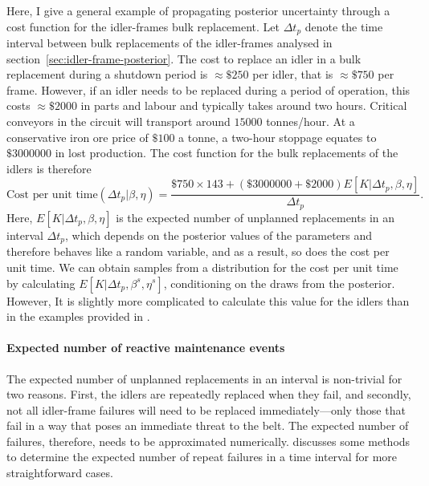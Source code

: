 Here, I give a general example of propagating posterior uncertainty through a cost function for the idler-frames bulk replacement. Let $\Delta t_p$ denote the time interval between bulk replacements of the idler-frames analysed in section~\ref{sec:idler-frame-posterior}. The cost to replace an idler in a bulk replacement during a shutdown period is $\approx\$250$ per idler, that is $\approx\$750$ per frame. However, if an idler needs to be replaced during a period of operation, this costs $\approx\$2000$ in parts and labour and typically takes around two hours. Critical conveyors in the circuit will transport around $15000$ tonnes/hour. At a conservative iron ore price of $\$100$ a tonne, a two-hour stoppage equates to $\$3000000$ in lost production. The cost function for the bulk replacements of the idlers is therefore
\begin{equation*}
 \text{Cost per unit time}(\Delta t_p|\beta, \eta) = \frac{\$750 \times 143 + (\$3000000 + \$2000) E[K|\Delta t_p,\beta,\eta]}{\Delta t_p}.
\end{equation*}
Here, $E[K|\Delta t_p,\beta,\eta]$ is the expected number of unplanned replacements in an interval $\Delta t_p$, which depends on the posterior values of the parameters and therefore behaves like a random variable, and as a result, so does the cost per unit time. We can obtain samples from a distribution for the cost per unit time by calculating $E[K|\Delta t_p,\beta^s,\eta^s]$, conditioning on the draws from the posterior. However, It is slightly more complicated to calculate this value for the idlers than in the examples provided in \citet{jardine2013}.

\paragraph*{Expected number of reactive maintenance events}

The expected number of unplanned replacements in an interval is non-trivial for two reasons. First, the idlers are repeatedly replaced when they fail, and secondly, not all idler-frame failures will need to be replaced immediately---only those that fail in a way that poses an immediate threat to the belt. The expected number of failures, therefore, needs to be approximated numerically. \citet[section~2.4.3 of ]{jardine2013} discusses some methods to determine the expected number of repeat failures in a time interval for more straightforward cases.

